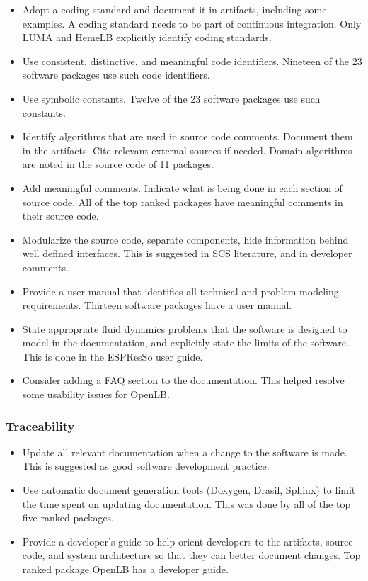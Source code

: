 \documentclass[final, 3p, times, authoryear]{elsarticle}
\begin{document}
\begin{itemize}
	\item Adopt a coding standard and document it in artifacts, including some examples. A coding standard needs to be part of continuous integration. Only
	LUMA and HemeLB explicitly identify coding standards. 
	\item Use consistent, distinctive, and meaningful code identifiers. Nineteen of the 23 software packages use such code identifiers.
	\item Use symbolic constants. Twelve of the 23 software packages use such constants.
	\item Identify algorithms that are used in source code comments. Document them in the artifacts. Cite relevant external sources if needed. Domain algorithms are noted in the source code of 11 packages.
	\item Add meaningful comments. Indicate what is being done in each section of source code. All of the top ranked packages have meaningful comments in their source code.
	\item Modularize the source code, separate components, hide information behind well defined interfaces. This is suggested in SCS literature, and in developer comments.
	\item Provide a user manual that identifies all technical and problem modeling requirements. Thirteen software packages have a user manual.
	\item State appropriate fluid dynamics problems that the software is designed to model in the documentation, and explicitly state the limits of the software. This is done in the ESPResSo user guide. 
	\item Consider adding a FAQ section to the documentation. This helped resolve some usability issues for OpenLB.
\end{itemize}

\subsubsection{Traceability}

\begin{itemize}
	\item Update all relevant documentation when a change to the software is made. This is suggested as good software development practice.
	\item Use automatic document generation tools (Doxygen, Drasil, Sphinx) to limit the time spent on updating documentation. This was done by all of the top five ranked packages.
	\item Provide a developer's guide to help orient developers to the artifacts, source code, and system architecture so that they can better document changes. Top ranked package OpenLB has a developer guide. 
\end{itemize}
\end{document}
